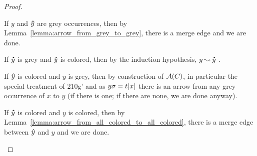 \documentclass[,%
	paper=a4,%
	DIV11, %
	twoside=false,%
	liststotoc,
	bibtotoc,
	draft=false,%
	numbers=noendperiod
]{scrartcl}
\begin{document}
{\begin{proof}
\begin{description}
			If $y$ and $\bm\hat y$ are grey occurrences, then by Lemma~\ref{lemma:arrow_from_grey_to_grey}, there is a merge edge and we are done.

			If $\bm\hat y$ is grey and $\bm\dot y$ is colored, then by the induction hypothesis, $y \operatorname{\leadsto} \bm\hat y$ . 

			If $\bm\hat y$ is colored and $y$ is grey,
			then by construction of $\operatorname{\mathcal{A}}(C)$, in particular the special treatment of 210g' and as $y\sigma = t[x]$ there is an arrow from any grey occurrence of $x$ to $y$ (if there is one; if there are none, we are done anyway).



			If $\bm\hat y$ is colored and $y$ is colored, then by Lemma~\ref{lemma:arrow_from_all_colored_to_all_colored}, there is a merge edge between $\bm\hat y$ and $y$ and we are done.
			\qedhere
	\end{description}
\end{proof}

}
\end{document}
